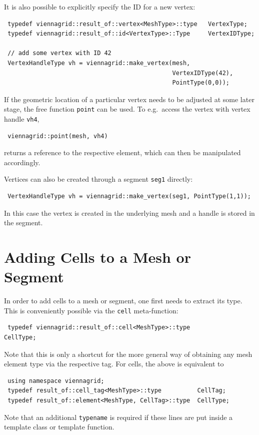 It is also possible to explicitly specify the ID for a new vertex:
\begin{lstlisting}
 typedef viennagrid::result_of::vertex<MeshType>::type   VertexType;
 typedef viennagrid::result_of::id<VertexType>::Type     VertexIDType;

 // add some vertex with ID 42
 VertexHandleType vh = viennagrid::make_vertex(mesh,
                                               VertexIDType(42),
                                               PointType(0,0));
\end{lstlisting}

If the geometric location of a particular vertex needs to be adjusted at some later stage, the free function \lstinline|point| can be used.
To e.g.~access the vertex with vertex handle \lstinline|vh4|,
\begin{lstlisting}
 viennagrid::point(mesh, vh4)
\end{lstlisting}
returns a reference to the respective element, which can then be manipulated accordingly.

Vertices can also be created through a segment \lstinline|seg1| directly:
\begin{lstlisting}
 VertexHandleType vh = viennagrid::make_vertex(seg1, PointType(1,1));
\end{lstlisting}
In this case the vertex is created in the underlying mesh and a handle is stored in the segment.


\section{Adding Cells to a Mesh or Segment}
In order to add cells to a mesh or segment, one first needs to extract its type.
This is conveniently possible via the \lstinline|cell| meta-function:
\begin{lstlisting}
 typedef viennagrid::result_of::cell<MeshType>::type              CellType;
\end{lstlisting}
Note that this is only a shortcut for the more general way of obtaining any mesh element type via the respective tag.
For cells, the above is equivalent to
\begin{lstlisting}
 using namespace viennagrid;
 typedef result_of::cell_tag<MeshType>::type          CellTag;
 typedef result_of::element<MeshType, CellTag>::type  CellType;
\end{lstlisting}

Note that an additional \lstinline|typename| is required if these lines are put inside a template class or template function.

